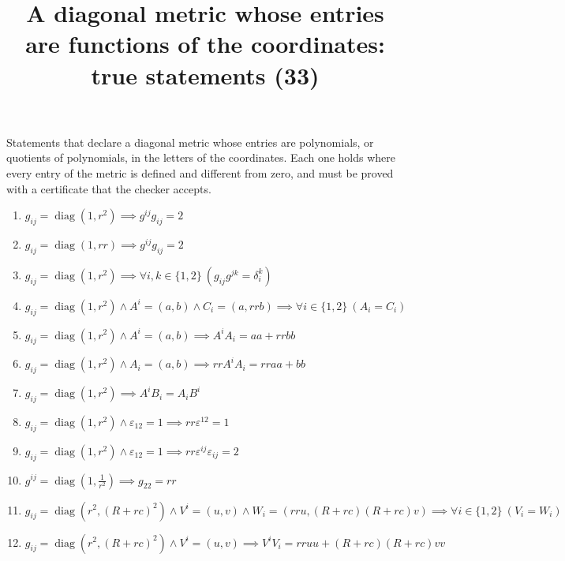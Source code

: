 \documentclass[11pt,a4paper]{article}
\title{A diagonal metric whose entries are functions of the coordinates: true statements (33)}
\author{}
\date{}
\begin{document}
\maketitle
Statements that declare a diagonal metric whose entries are polynomials, or quotients of polynomials, in the letters of the coordinates. Each one holds where every entry of the metric is defined and different from zero, and must be proved with a certificate that the checker accepts.

\begin{enumerate}
\item $\displaystyle g_{ij} = \operatorname{diag}(1, r^{2}) \implies g^{ij} g_{ij} = 2$
\item $\displaystyle g_{ij} = \operatorname{diag}(1, r r) \implies g^{ij} g_{ij} = 2$
\item $\displaystyle g_{ij} = \operatorname{diag}(1, r^{2}) \implies \forall i, k \in \{1, 2\}\ \left( g_{ij} g^{jk} = \delta_{i}^{k} \right)$
\item $\displaystyle g_{ij} = \operatorname{diag}(1, r^{2}) \land A^{i} = (a, b) \land C_{i} = (a, r r b) \implies \forall i \in \{1, 2\}\ \left( A_{i} = C_{i} \right)$
\item $\displaystyle g_{ij} = \operatorname{diag}(1, r^{2}) \land A^{i} = (a, b) \implies A^{i} A_{i} = a a + r r b b$
\item $\displaystyle g_{ij} = \operatorname{diag}(1, r^{2}) \land A_{i} = (a, b) \implies r r A^{i} A_{i} = r r a a + b b$
\item $\displaystyle g_{ij} = \operatorname{diag}(1, r^{2}) \implies A^{i} B_{i} = A_{i} B^{i}$
\item $\displaystyle g_{ij} = \operatorname{diag}(1, r^{2}) \land \varepsilon_{12} = 1 \implies r r \varepsilon^{12} = 1$
\item $\displaystyle g_{ij} = \operatorname{diag}(1, r^{2}) \land \varepsilon_{12} = 1 \implies r r \varepsilon^{ij}\varepsilon_{ij} = 2$
\item $\displaystyle g^{ij} = \operatorname{diag}(1, \frac{1}{r^{2}}) \implies g_{22} = r r$
\item $\displaystyle g_{ij} = \operatorname{diag}(r^{2}, (R + r c)^{2}) \land V^{i} = (u, v) \land W_{i} = (r r u, (R + r c)(R + r c) v) \implies \forall i \in \{1, 2\}\ \left( V_{i} = W_{i} \right)$
\item $\displaystyle g_{ij} = \operatorname{diag}(r^{2}, (R + r c)^{2}) \land V^{i} = (u, v) \implies V^{i} V_{i} = r r u u + (R + r c)(R + r c) v v$

\end{enumerate}
\end{document}
